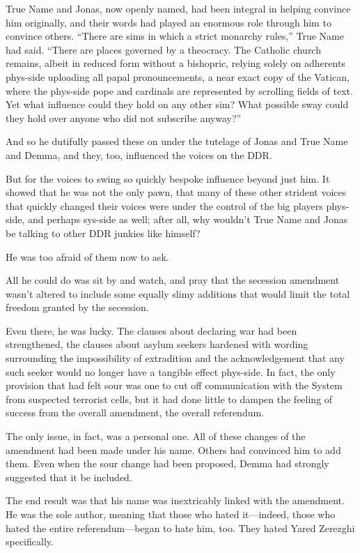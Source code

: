 True Name and Jonas, now openly named, had been integral in helping convince him originally, and their words had played an enormous role through him to convince others. ``There are sims in which a strict monarchy rules,'' True Name had said. ``There are places governed by a theocracy. The Catholic church remains, albeit in reduced form without a bishopric, relying solely on adherents phys-side uploading all papal pronouncements, a near exact copy of the Vatican, where the phys-side pope and cardinals are represented by scrolling fields of text. Yet what influence could they hold on any other sim? What possible sway could they hold over anyone who did not subscribe anyway?''

And so he dutifully passed these on under the tutelage of Jonas and True Name and Demma, and they, too, influenced the voices on the DDR.

But for the voices to swing so quickly bespoke influence beyond just him. It showed that he was not the only pawn, that many of these other strident voices that quickly changed their voices were under the control of the big players phys-side, and perhaps sys-side as well; after all, why wouldn't True Name and Jonas be talking to other DDR junkies like himself?

He was too afraid of them now to ask.

All he could do was sit by and watch, and pray that the secession amendment wasn't altered to include some equally slimy additions that would limit the total freedom granted by the secession.

Even there, he was lucky. The clauses about declaring war had been strengthened, the clauses about asylum seekers hardened with wording surrounding the impossibility of extradition and the acknowledgement that any such seeker would no longer have a tangible effect phys-side. In fact, the only provision that had felt sour was one to cut off communication with the System from suspected terrorist cells, but it had done little to dampen the feeling of success from the overall amendment, the overall referendum.

The only issue, in fact, was a personal one. All of these changes of the amendment had been made under his name. Others had convinced him to add them. Even when the sour change had been proposed, Demma had strongly suggested that it be included.

The end result was that his name was inextricably linked with the amendment. He was the sole author, meaning that those who hated it---indeed, those who hated the entire referendum---began to hate him, too. They hated Yared Zerezghi specifically.

